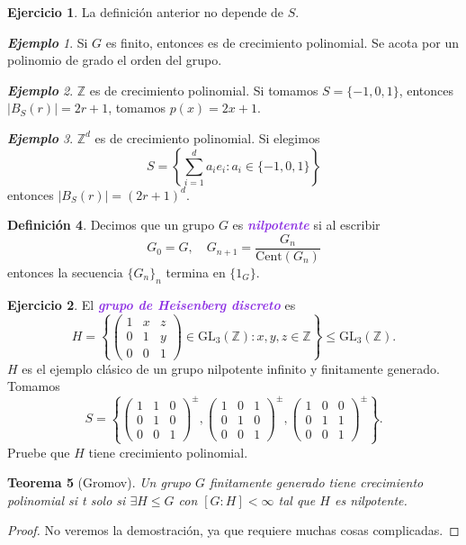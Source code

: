 \documentclass{article}
\newtheorem{theorem}{Teorema}[subsection]
\theoremstyle{definition}
\newtheorem{definition}[theorem]{Definición}
\newtheorem{exercise}{Ejercicio}
\theoremstyle{remark}
\newtheorem{example}[theorem]{\textbf{Ejemplo}}
\numberwithin{equation}{section}
\newcommand{\Z}{\mathbb{Z}}
\newcommand{\oo}{\infty}
\newcommand{\GL}{\mathrm{GL}}
\newcommand{\Cent}{\mathrm{Cent}}
\newcommand{\abs}[1]{\left| #1 \right|}
\newcommand{\set}[1]{\left\{ #1 \right\}}
\newcommand{\matr}[1]{\begin{pmatrix}#1\end{pmatrix}}
\newcommand{\wea}[1]{\textcolor{BlueViolet}{\textbf{\emph{#1}}}}
\begin{document}
\begin{exercise}
  La definición anterior no depende de $S$.
\end{exercise}

\begin{example}
  Si $G$ es finito, entonces es de crecimiento polinomial. Se acota por un polinomio de grado el orden del grupo.
\end{example}

\begin{example}
  $\Z$ es de crecimiento polinomial. Si tomamos $S = \{-1,0,1\}$, entonces $\abs{B_S(r)} = 2r + 1$, tomamos $p(x) = 2x+1$.
\end{example}

\begin{example}
  $\Z^d$ es de crecimiento polinomial. Si elegimos
  \[S = \set{\sum_{i=1}^d a_ie_i \colon a_i \in \{-1,0,1\}}\]
  entonces $\abs{B_S(r)} = (2r+1)^d.$
\end{example}

\begin{definition}
  Decimos que un grupo $G$ es \wea{nilpotente} si al escribir
  \[G_0 = G, \quad G_{n+1} = \frac{G_n}{\Cent(G_n)}\]
  entonces la secuencia $\{G_n\}_n$ termina en $\{1_G\}$.
\end{definition}

\begin{exercise}
  El \wea{grupo de Heisenberg discreto} es
  \[H = \set{\matr{1 & x & z \\ 0 & 1 & y \\ 0 & 0 & 1} \in \GL_3(\Z) \colon x,y,z \in \Z} \leqslant \GL_3(\Z).\]
  $H$ es el ejemplo clásico de un grupo nilpotente infinito y finitamente generado. Tomamos
  \[S = \set{\matr{1&1&0\\0&1&0\\0&0&1}^\pm, \matr{1&0&1\\0&1&0\\0&0&1}^\pm, \matr{1&0&0\\0&1&1\\0&0&1}^\pm}.\]
  Pruebe que $H$ tiene crecimiento polinomial.
\end{exercise}

\begin{theorem}
  [Gromov]
  Un grupo $G$ finitamente generado tiene crecimiento polinomial si t solo si $\exists H \leqslant G$ con $[G \colon H] < \oo$ tal que $H$ es nilpotente.
\end{theorem}
\begin{proof}
  No veremos la demostración, ya que requiere muchas cosas complicadas.
\end{proof}
\end{document}
